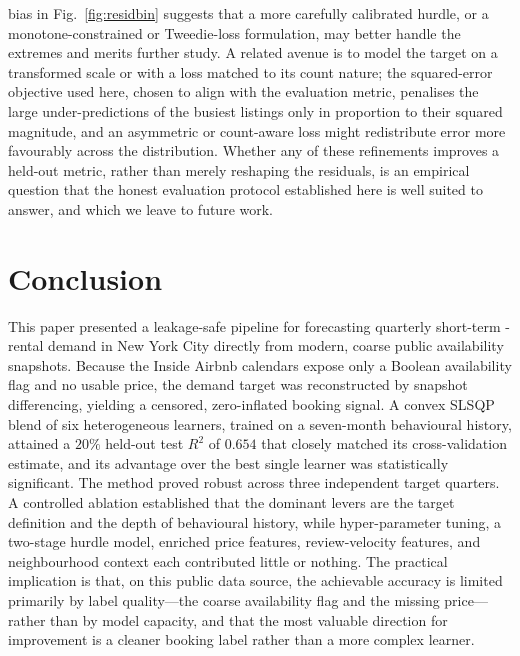 \documentclass[journal]{IEEEtran}
\begin{document}
bias in Fig.~\ref{fig:residbin} suggests that a more carefully calibrated hurdle,
or a monotone-constrained or Tweedie-loss formulation, may better handle the
extremes and merits further study. A related avenue is to model the target on a
transformed scale or with a loss matched to its count nature; the squared-error
objective used here, chosen to align with the evaluation metric, penalises the large
under-predictions of the busiest listings only in proportion to their squared
magnitude, and an asymmetric or count-aware loss might redistribute error more
favourably across the distribution. Whether any of these refinements improves a
held-out metric, rather than merely reshaping the residuals, is an empirical
question that the honest evaluation protocol established here is well suited to
answer, and which we leave to future work.

\section{Conclusion}
\label{sec:concl}
This paper presented a leakage-safe pipeline for forecasting quarterly short-term
-rental demand in New York City directly from modern, coarse public availability
snapshots. Because the Inside Airbnb calendars expose only a Boolean availability
flag and no usable price, the demand target was reconstructed by snapshot
differencing, yielding a censored, zero-inflated booking signal. A convex SLSQP
blend of six heterogeneous learners, trained on a seven-month behavioural history,
attained a $20\%$ held-out test $R^2$ of $0.654$ that closely matched its
cross-validation estimate, and its advantage over the best single learner was
statistically significant. The method proved robust across three independent
target quarters. A controlled ablation established that the dominant levers are the
target definition and the depth of behavioural history, while hyper-parameter
tuning, a two-stage hurdle model, enriched price features, review-velocity
features, and neighbourhood context each contributed little or nothing. The
practical implication is that, on this public data source, the achievable accuracy
is limited primarily by label quality---the coarse availability flag and the
missing price---rather than by model capacity, and that the most valuable direction
for improvement is a cleaner booking label rather than a more complex learner.
\end{document}
